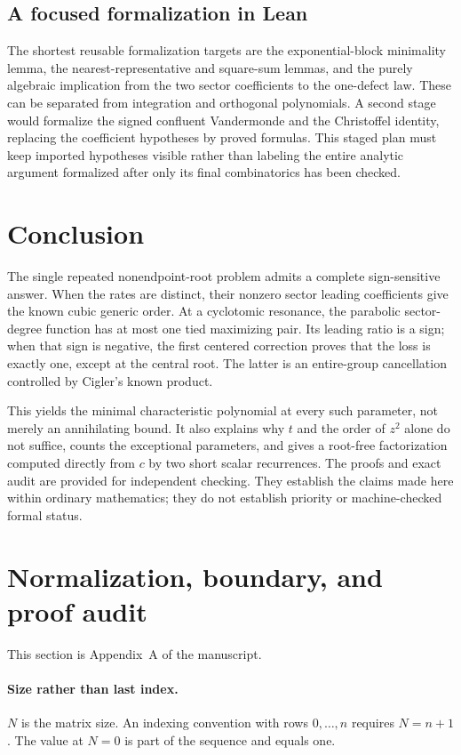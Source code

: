 \documentclass[11pt,a4paper]{article}
\numberwithin{equation}{section}
\theoremstyle{definition}
\theoremstyle{remark}
\begin{document}
\subsection{A focused formalization in Lean}
The shortest reusable formalization targets are the exponential-block
minimality lemma, the nearest-representative and square-sum lemmas,
and the purely algebraic implication from the two sector coefficients
to the one-defect law.  These can be separated from integration and
orthogonal polynomials.  A second stage would formalize the signed
confluent Vandermonde and the Christoffel identity, replacing the
coefficient hypotheses by proved formulas.  This staged plan must
keep imported hypotheses visible rather than labeling the entire
analytic argument formalized after only its final combinatorics has
been checked.

\section{Conclusion}\label{cyc:sec:conclusion}

The single repeated nonendpoint-root problem admits a complete
sign-sensitive answer.  When the rates are distinct, their nonzero
sector leading coefficients give the known cubic generic order.
At a cyclotomic resonance, the parabolic sector-degree function has
at most one tied maximizing pair.  Its leading ratio is a sign; when
that sign is negative, the first centered correction proves that the
loss is exactly one, except at the central root.  The latter is an
entire-group cancellation controlled by Cigler's known product.

This yields the minimal characteristic polynomial at every such
parameter, not merely an annihilating bound.  It also explains why
$t$ and the order of $z^2$ alone do not suffice, counts the exceptional
parameters, and gives a root-free factorization computed directly from
$c$ by two short scalar recurrences.  The proofs and exact audit are
provided for independent checking.  They establish the claims made
here within ordinary mathematics; they do not establish priority or
machine-checked formal status.

\section{Normalization, boundary, and proof audit}\label{cyc:app:audit}

This section is Appendix~A of the manuscript.

\paragraph{Size rather than last index.}
$N$ is the matrix size.  An indexing convention with rows
$0,\ldots,n$ requires $N=n+1$.  The value at $N=0$ is part of the
sequence and equals one.
\end{document}
